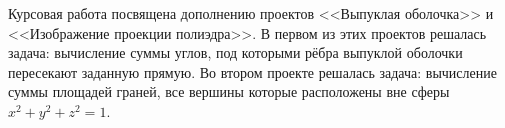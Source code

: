 Курсовая работа посвящена дополнению проектов <<Выпуклая оболочка>> и
<<Изображение проекции полиэдра>>. В первом из этих проектов решалась
задача: вычисление суммы углов, под которыми рёбра выпуклой оболочки пересекают заданную прямую. Во втором проекте решалась задача: вычисление суммы площадей граней, все вершины которые расположены вне сферы $x^2+y^2+z^2=1$.
